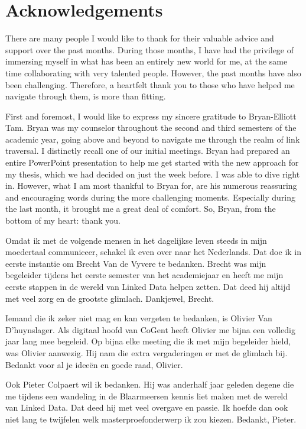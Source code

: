 \pagestyle{plainpage}

\chapter*{Acknowledgements}

There are many people I would like to thank for their valuable advice and support over the past months. During those months, I have had the privilege of immersing myself in what has been an entirely new world for me, at the same time collaborating with very talented people. However, the past months have also been challenging. Therefore, a heartfelt thank you to those who have helped me navigate through them, is more than fitting.

First and foremost, I would like to express my sincere gratitude to Bryan-Elliott Tam. Bryan was my counselor throughout the second and third semesters of the academic year, going above and beyond to navigate me through the realm of link traversal. I distinctly recall one of our initial meetings. Bryan had prepared an entire PowerPoint presentation to help me get started with the new approach for my thesis, which we had decided on just the week before. I was able to dive right in. However, what I am most thankful to Bryan for, are his numerous reassuring and encouraging words during the more challenging moments. Especially during the last month, it brought me a great deal of comfort. So, Bryan, from the bottom of my heart: thank you.

Omdat ik met de volgende mensen in het dagelijkse leven steeds in mijn moedertaal communiceer, schakel ik even over naar het Nederlands. Dat doe ik in eerste instantie om Brecht Van de Vyvere te bedanken. Brecht was mijn begeleider tijdens het eerste semester van het academiejaar en heeft me mijn eerste stappen in de wereld van Linked Data helpen zetten. Dat deed hij altijd met veel zorg en de grootste glimlach. Dankjewel, Brecht.

Iemand die ik zeker niet mag en kan vergeten te bedanken, is Olivier Van D'huynslager. Als digitaal hoofd van CoGent heeft Olivier me bijna een volledig jaar lang mee begeleid. Op bijna elke meeting die ik met mijn begeleider hield, was Olivier aanwezig. Hij nam die extra vergaderingen er met de glimlach bij. Bedankt voor al je ideeën en goede raad, Olivier.

Ook Pieter Colpaert wil ik bedanken. Hij was anderhalf jaar geleden degene die me tijdens een wandeling in de Blaarmeersen kennis liet maken met de wereld van Linked Data. Dat deed hij met veel overgave en passie. Ik hoefde dan ook niet lang te twijfelen welk masterproefonderwerp ik zou kiezen. Bedankt, Pieter.

